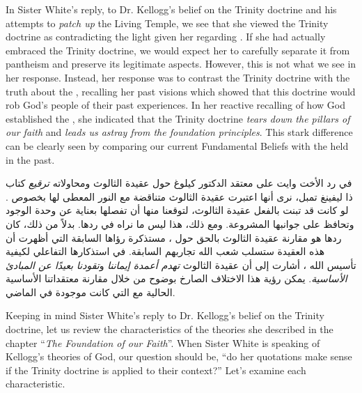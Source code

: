 



In Sister White's reply, to Dr. Kellogg's belief on the Trinity doctrine and his attempts to \textit{patch up} the Living Temple, we see that she viewed the Trinity doctrine as contradicting the light given her regarding . If she had actually embraced the Trinity doctrine, we would expect her to carefully separate it from pantheism and preserve its legitimate aspects. However, this is not what we see in her response. Instead, her response was to contrast the Trinity doctrine with the truth about the , recalling her past visions which showed that this doctrine would rob God's people of their past experiences. In her reactive recalling of how God established the , she indicated that the Trinity doctrine \textit{tears down the pillars of our faith} and \textit{leads us astray from the foundation principles}. This stark difference can be clearly seen by comparing our current Fundamental Beliefs with the  held in the past.


في رد الأخت وايت على معتقد الدكتور كيلوغ حول عقيدة الثالوث ومحاولاته \textit{ترقيع} كتاب ذا ليفينغ تمبل، نرى أنها اعتبرت عقيدة الثالوث متناقضة مع النور المعطى لها بخصوص . لو كانت قد تبنت بالفعل عقيدة الثالوث، لتوقعنا منها أن تفصلها بعناية عن وحدة الوجود وتحافظ على جوانبها المشروعة. ومع ذلك، هذا ليس ما نراه في ردها. بدلاً من ذلك، كان ردها هو مقارنة عقيدة الثالوث بالحق حول ، مستذكرة رؤاها السابقة التي أظهرت أن هذه العقيدة ستسلب شعب الله تجاربهم السابقة. في استذكارها التفاعلي لكيفية تأسيس الله ، أشارت إلى أن عقيدة الثالوث \textit{تهدم أعمدة إيماننا} و\textit{تقودنا بعيدًا عن المبادئ الأساسية}. يمكن رؤية هذا الاختلاف الصارخ بوضوح من خلال مقارنة معتقداتنا الأساسية الحالية مع  التي كانت موجودة في الماضي.


Keeping in mind Sister White’s reply to Dr. Kellogg's belief on the Trinity doctrine, let us review the characteristics of the theories she described in the chapter “\textit{The Foundation of our Faith}”. When Sister White is speaking of Kellogg’s theories of God, our question should be, “do her quotations make sense if the Trinity doctrine is applied to their context?” Let’s examine each characteristic.


